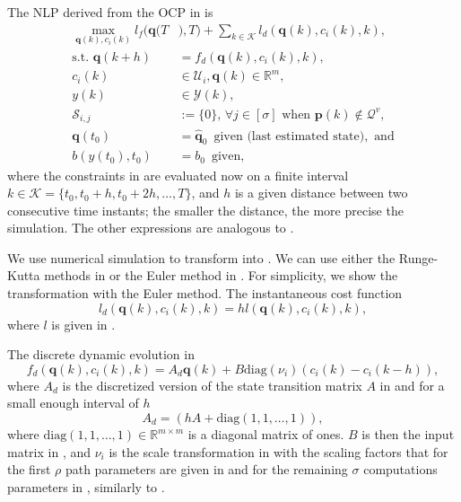 The NLP derived from the OCP in  is
\begin{subequations}\label{eq:disc-ocp-output-mpc}\begin{align}
  \max_{\mathbf{q}(k),c_i(k)}{l_f(\mathbf{q}(T}&{),T)+\sum_{k\in\mathcal{K}}{l_d(\mathbf{q}(k),c_i(k),k)}},\\
  \text{s.t. }\mathbf{q}(k+h)&=f_d(\mathbf{q}(k),c_i(k),k),\label{eq:disc-dyn-evol}\\
  c_i(k)&\in\mathcal{U}_i,\mathbf{q}(k)\in\mathbb{R}^m,\label{eq:disc-state-cont-const-mpc}\\
  y(k)&\in\mathcal{Y}(k),\label{eq:disc-batt-const-mpc}\\
  \mathcal{S}_{i,j}&:=\{0\},\,\forall j \in [\sigma]\text{ when }\mathbf{p}(k)\notin\mathcal{Q}^v,\label{eq:disc-polyg-const}\\
  \mathbf{q}(t_0)&=\hat{\mathbf{q}}_0\,\,\,\text{given (last estimated state)},\text{ and}\\
  b(y(t_0),t_0)&=b_0\,\,\,\text{given},
\end{align}\end{subequations}
where the constraints in  are evaluated now on a finite interval $k\in\mathcal{K}=\{t_0,t_0+h,t_0+2h,\dots,T\}$, and $h$ is a given distance between two  consecutive time instants; the smaller the distance, the more precise the simulation. The other expressions are analogous to .

We use numerical simulation to transform  into . We can use either the Runge-Kutta methods in  or the Euler method in . For simplicity, we show the transformation with the Euler method. The instantaneous cost function
\begin{equation}\label{eq:mpc-cost-euler}
  l_d(\mathbf{q}(k),c_i(k),k)=hl(\mathbf{q}(k),c_i(k),k),
\end{equation}
where $l$ is given in .

The discrete dynamic evolution in 
\begin{equation}
  f_d(\mathbf{q}(k),c_i(k),k)=A_d\mathbf{q}(k)+B\mathrm{diag}(\nu_i)(c_i(k)-c_i(k-h)),
\end{equation}
where $A_d$ is the discretized version of the state transition matrix $A$ in  and for a small enough interval of $h$
\begin{equation}
A_d=(hA+\mathrm{diag}(1,1,\dots,1)),
\end{equation}
where $\mathrm{diag}(1,1,\dots,1)\in\mathbb{R}^{m\times m}$ is a diagonal matrix of ones. $B$ is then the input matrix in , and $\nu_i$ is the scale transformation in  with the scaling factors that for the first $\rho$ path parameters are given in  and for the remaining $\sigma$ computations parameters in , similarly to .

